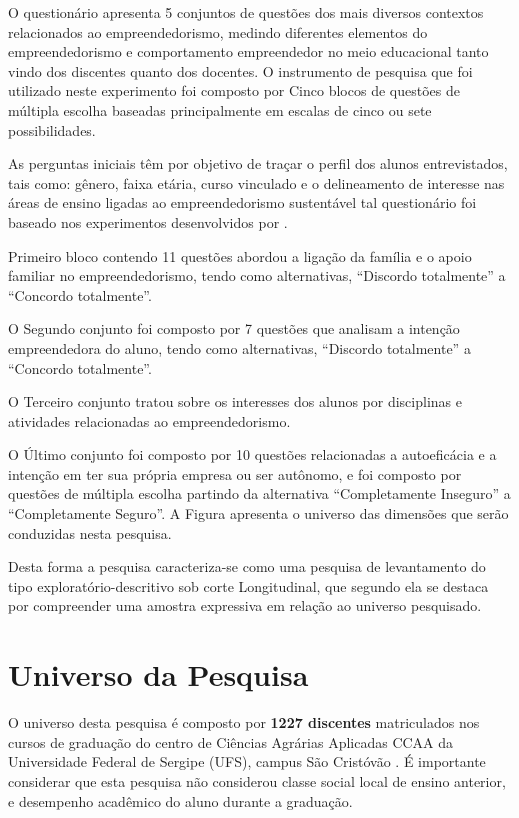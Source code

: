 O questionário apresenta 5 conjuntos de questões dos mais diversos contextos relacionados ao empreendedorismo, medindo diferentes elementos do empreendedorismo e comportamento empreendedor no meio educacional tanto vindo dos discentes quanto dos docentes. O instrumento de pesquisa que foi utilizado neste experimento foi composto por Cinco blocos de questões de múltipla escolha baseadas principalmente em escalas de cinco ou sete possibilidades.

As perguntas iniciais têm por objetivo de traçar o perfil dos alunos entrevistados, tais como: gênero, faixa etária, curso vinculado e o delineamento de interesse nas áreas de ensino ligadas ao empreendedorismo sustentável tal questionário foi baseado nos experimentos desenvolvidos por .

Primeiro bloco contendo 11 questões abordou a ligação da família e o apoio familiar no empreendedorismo, tendo como alternativas, “Discordo totalmente” a “Concordo totalmente”.

O Segundo conjunto foi composto por 7 questões que analisam a intenção empreendedora do aluno, tendo como alternativas, “Discordo totalmente” a “Concordo totalmente”.

O Terceiro conjunto tratou sobre os interesses dos alunos por disciplinas e atividades relacionadas ao empreendedorismo.

O Último conjunto foi composto por 10 questões relacionadas a autoeficácia e a intenção em ter sua própria empresa ou ser autônomo, e foi composto por questões de múltipla escolha partindo da alternativa “Completamente Inseguro” a “Completamente Seguro”. A Figura  apresenta o universo das dimensões que serão conduzidas nesta pesquisa.


Desta forma a pesquisa caracteriza-se como uma pesquisa de levantamento do tipo exploratório-descritivo sob corte Longitudinal, que segundo  ela se destaca por compreender uma amostra expressiva em relação ao universo pesquisado.

\section{Universo da Pesquisa}

O universo desta pesquisa é composto por \textbf{1227 discentes} matriculados nos cursos de graduação do centro de Ciências Agrárias Aplicadas CCAA da Universidade Federal de Sergipe (UFS), campus São Cristóvão \cite{andrade_ufs_2019}. É importante considerar que esta pesquisa não considerou classe social local de ensino anterior, e desempenho acadêmico do aluno durante a graduação.

